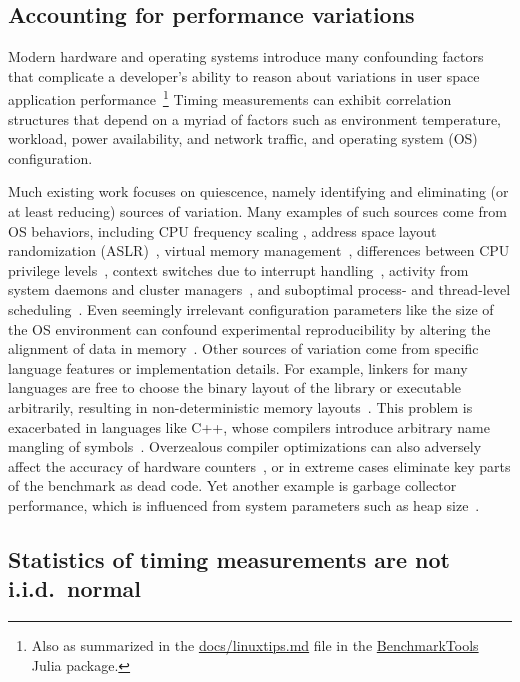 \documentclass[conference]{IEEEtran}
\begin{document}
\subsection{Accounting for performance variations}
\label{sec:variations}

Modern hardware and operating systems introduce many confounding factors that
complicate a developer's ability to reason about variations in user space
application performance~\cite{HP5e}\footnote{Also as summarized in the
\href{https://github.com/JuliaCI/BenchmarkTools.jl/blob/4db27210d43abf2c55226366f3a749afe1d64951/doc/linuxtips.md}{docs/linuxtips.md}
file in the \href{https://github.com/JuliaCI/BenchmarkTools.jl}{BenchmarkTools}
Julia package.}
Timing measurements can exhibit correlation structures that depend on a myriad
of factors such as environment temperature, workload, power availability, and
network traffic, and operating system (OS) configuration.

Much existing work focuses on quiescence, namely identifying and eliminating
(or at least reducing) sources of variation. Many examples of such sources come
from OS behaviors, including CPU frequency scaling \cite{RHEL6}, address space
layout randomization (ASLR)~\cite{Shacham2004}, virtual memory
management~\cite{Oyama2014,Oyama2016}, differences between CPU privilege
levels~\cite{Zaparanuks2009}, context switches due to interrupt
handling~\cite{Tsafrir2007}, activity from system daemons and cluster
managers~\cite{Petrini2003}, and suboptimal process- and thread-level
scheduling~\cite{Lozi2016}. Even seemingly irrelevant configuration parameters
like the size of the OS environment can confound experimental reproducibility
by altering the alignment of data in memory~\cite{Mytkowicz2009}.
Other sources of variation come from specific language features or
implementation details. For example, linkers for many languages are free to
choose the binary layout of the library or executable arbitrarily, resulting in
non-deterministic memory layouts~\cite{Georges2008}. This problem is
exacerbated in languages like C++, whose compilers introduce arbitrary name
mangling of symbols~\cite{Kalibera2005}. Overzealous compiler optimizations
can also adversely affect the accuracy of hardware
counters~\cite{Zaparanuks2009}, or in extreme cases eliminate key parts of the
benchmark as dead code. Yet another example is garbage collector performance,
which is influenced from system parameters such as heap
size~\cite{Blackburn2004}.

\subsection{Statistics of timing measurements are not i.i.d.\ normal}
\label{sec:toughstats}
\end{document}
